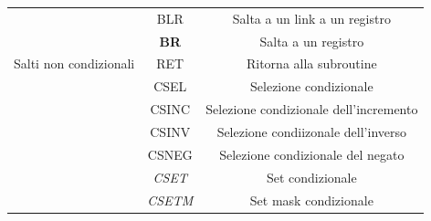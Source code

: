 \documentclass[12pt,a4paper]{article}
\begin{document}
\begin{center}
\begin{tabular}{|c|c|c|}
                                                                                                             & BLR             & Salta a un link a un registro                                                                             \\ \cline{2-3} 
                                                                                                             & \textbf{BR}     & Salta a un registro                                                                                       \\ \cline{2-3} 
\multirow{-5}{*}{Salti non condizionali}                                                                     & RET             & Ritorna alla subroutine                                                                                   \\ \hline
                                                                                                             & CSEL            & Selezione condizionale                                                                                    \\ \cline{2-3} 
                                                                                                             & CSINC           & Selezione condizionale dell'incremento                                                                    \\ \cline{2-3} 
                                                                                                             & CSINV           & Selezione condiizonale dell'inverso                                                                       \\ \cline{2-3} 
                                                                                                             & CSNEG           & Selezione condizionale del negato                                                                         \\ \cline{2-3} 
                                                                                                             & \textit{CSET}   & Set condizionale                                                                                          \\ \cline{2-3} 
                                                                                                             & \textit{CSETM}  & Set mask condizionale                                                                                     \\ \cline{2-3} 

\end{tabular}
\end{center}
\end{document}
